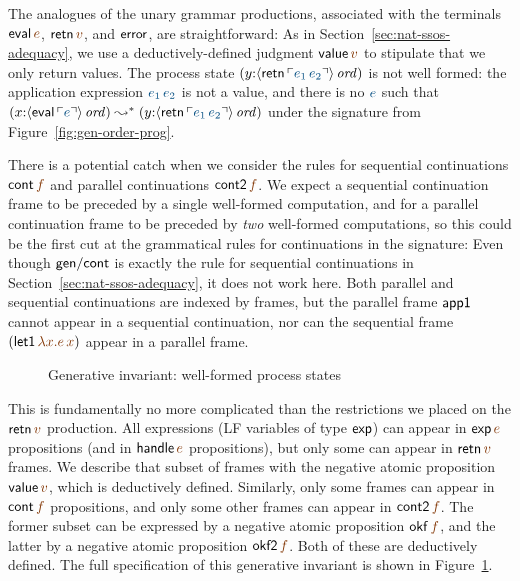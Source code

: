 The analogues of the unary grammar productions, associated with the
terminals ${\sf eval}\,\lf{e}$, ${\sf retn}\,\lf{v}$, and ${\sf
  error}$, are straightforward:
%
\smallskip
{}
\smallskip 
%
As in Section~\ref{sec:nat-ssos-adequacy}, we use a
deductively-defined judgment ${\sf value}\,\lf{v}$ to stipulate that
we only return values. The process state $(y{:}\istrue{\susp{{\sf
      retn}\,\interp{e_1\,e_2}}})$ is not well formed: the
application expression $\obj{e_1\,e_2}$ is not a value, and
there is no $\obj{e}$ such that $(x{:}\istrue{\susp{{\sf
      eval}\,\interp{e}}}) \leadsto^* (y{:}\istrue{\susp{{\sf
      retn}\,\interp{e_1\,e_2}}})$ under the signature from
Figure~\ref{fig:gen-order-prog}.

There is a potential catch when we consider the rules for sequential
continuations ${\sf cont}\,\lf{f}$ and parallel continuations ${\sf
  cont2}\,\lf{f}$. We expect a sequential continuation frame to be
preceded by a single well-formed computation, and for a parallel
continuation frame to be preceded by {\it two} well-formed
computations, so this could be the first cut at the grammatical rules
for continuations in the signature:
%
\smallskip
{}
\smallskip 
%
Even though ${\sf gen/cont}$ is exactly the rule for sequential
continuations in Section~\ref{sec:nat-ssos-adequacy}, it does not work
here.  Both parallel and sequential continuations are indexed by
frames, but the parallel frame ${\sf app1}$ cannot appear in a
sequential continuation, nor can the sequential frame $({\sf
  let1}\,\lf{\lambda x.e\,x})$ appear in a parallel frame. 

\begin{figure}[tp]
\caption{Generative invariant: well-formed process states}
\label{fig:gen-order} 
\end{figure}

This is fundamentally no more complicated than the restrictions we
placed on the ${\sf retn}\,\lf{v}$ production. All expressions (LF
variables of type ${\sf exp}$) can appear in ${\sf exp}\,\lf{e}$
propositions (and in ${\sf handle}\,\lf{e}$ propositions), but only
some can appear in ${\sf retn}\,\lf{v}$ frames. We describe that
subset of frames with the negative atomic proposition ${\sf
  value}\,\lf{v}$, which is deductively defined. Similarly, only some
frames can appear in ${\sf cont}\,\lf{f}$ propositions, and only some
other frames can appear in ${\sf cont2}\,\lf{f}$. The former subset
can be expressed by a negative atomic proposition ${\sf okf}\,\lf{f}$,
and the latter by a negative atomic proposition ${\sf okf2}\,\lf{f}$.
Both of these are deductively defined.  The full specification of this
generative invariant is shown in Figure~\ref{fig:gen-order}.

